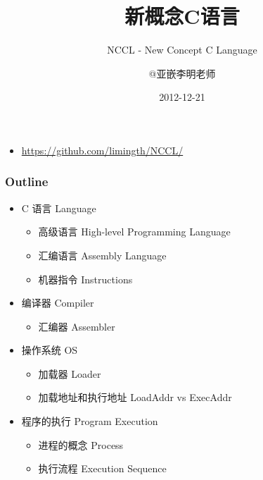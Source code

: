 \documentclass[11pt]{beamer}
\title{新概念C语言}
\subtitle{NCCL - New Concept C Language}
\author{@亚嵌李明老师}
\institute{limingth@gmail.com}
\date{2012-12-21}
\begin{document}
\begin{frame}
\titlepage
\begin{itemize}
\item 	\url{https://github.com/limingth/NCCL/}
\end{itemize}
\end{frame}

\begin{frame}
\frametitle{Outline}
\begin{itemize}
\item C 语言 Language   
	\begin{itemize}
	\item  
        高级语言 High-level Programming Language
	\item 
        汇编语言 Assembly Language
	\item 
        机器指令 Instructions
	\end{itemize}

\item 编译器 Compiler  
	\begin{itemize}  
	\item  
        汇编器 Assembler
	\end{itemize}
\item 操作系统 OS
	\begin{itemize}
	\item  
        加载器 Loader
	\item  
        加载地址和执行地址 LoadAddr vs ExecAddr
	\end{itemize}
\item 程序的执行 Program Execution
	\begin{itemize}
	\item  
        进程的概念 Process
	\item  
        执行流程 Execution Sequence
	\end{itemize}
\end{itemize}
\tableofcontents[currentsection]
\end{frame}



\end{document}
